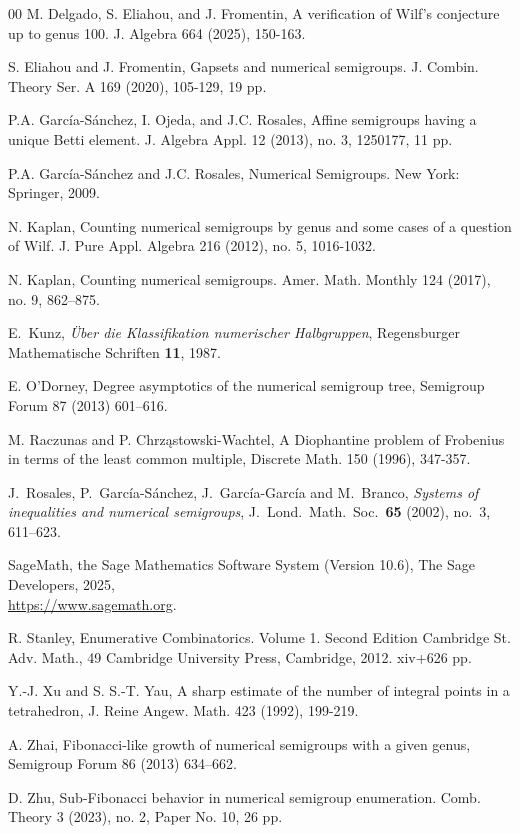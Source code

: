 \documentclass[12pt]{amsart}
\theoremstyle{plain}\newtheorem{proposition}{Proposition}[section]
\begin{document}
\begin{thebibliography}{00}
 M. Delgado, S. Eliahou, and J. Fromentin, A verification of Wilf's conjecture up to genus 100. J. Algebra 664 (2025), 150-163.

 S. Eliahou and J. Fromentin, Gapsets and numerical semigroups. J. Combin. Theory Ser. A 169 (2020), 105-129, 19 pp.

 P.A. Garc\'ia-S\'anchez, I. Ojeda, and J.C. Rosales, Affine semigroups having a unique Betti element. J. Algebra Appl. 12 (2013), no. 3, 1250177, 11 pp.

 P.A. Garc\'ia-S\'anchez and J.C. Rosales, Numerical Semigroups. New York: Springer, 2009.

 N. Kaplan, Counting numerical semigroups by genus and some cases of a question of Wilf. J. Pure Appl. Algebra 216 (2012), no. 5, 1016-1032.

 N. Kaplan, Counting numerical semigroups. Amer. Math. Monthly 124 (2017), no. 9, 862--875.

 E.~Kunz, \emph{\"Uber die Klassifikation numerischer Halbgruppen}, Regensburger Mathematische Schriften \textbf{11}, 1987.

 E. O’Dorney, Degree asymptotics of the numerical semigroup tree, Semigroup Forum 87 (2013) 601–616.

 M. Raczunas and P. Chrząstowski-Wachtel, A Diophantine problem of Frobenius in terms of the least common multiple, Discrete Math. 150 (1996), 347-357.

 J.~Rosales, P.~Garc\'ia-S\'anchez, J.~Garc\'ia-Garc\'ia and M.~Branco, \emph{Systems of inequalities and numerical semigroups}, J.~Lond.\ Math.\ Soc.\ \textbf{65} (2002), no.~3, 611--623.

 SageMath, the Sage Mathematics Software System (Version 10.6),
   The Sage Developers, 2025,\\
   \url{https://www.sagemath.org}.

 R. Stanley, Enumerative Combinatorics. Volume 1. Second Edition Cambridge St. Adv. Math., 49 Cambridge University Press, Cambridge, 2012. xiv+626 pp.

 Y.-J. Xu and S. S.-T. Yau, A sharp estimate of the number of integral points in a tetrahedron, J. Reine Angew. Math. 423 (1992), 199-219.



 A. Zhai, Fibonacci-like growth of numerical semigroups with a given genus, Semigroup Forum 86 (2013) 634–662.

 D. Zhu, Sub-Fibonacci behavior in numerical semigroup enumeration. Comb. Theory 3 (2023), no. 2, Paper No. 10, 26 pp.

\end{thebibliography}
\end{document}
